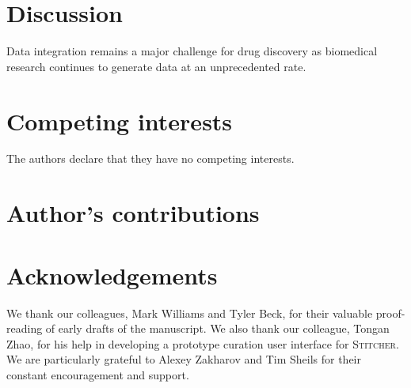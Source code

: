 \documentclass{bmcart}
\newcommand\st{\textsc{Stitcher}}
\begin{document}
\section*{Discussion}
Data integration remains a major challenge for drug discovery as
biomedical research continues to generate data at an unprecedented
rate. 


\begin{backmatter}

\section*{Competing interests}
  The authors declare that they have no competing interests.

\section*{Author's contributions}


\section*{Acknowledgements}
We thank our colleagues, Mark Williams and Tyler Beck, for their
valuable proof-reading of early drafts of the manuscript. We also
thank our colleague, Tongan Zhao, for his help in developing a
prototype curation user interface for \st. We are particularly grateful
to Alexey Zakharov and Tim Sheils for their constant encouragement and
support.



\end{backmatter}
\end{document}
